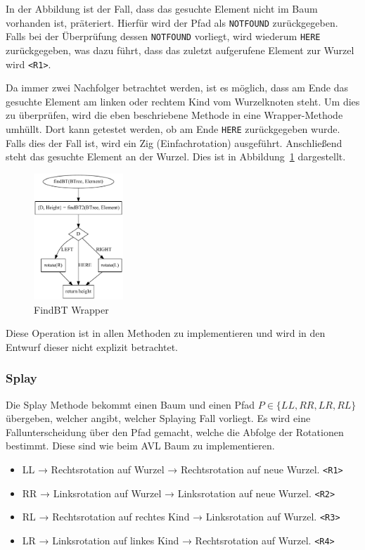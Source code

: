 In der Abbildung ist der Fall, dass das gesuchte Element nicht im Baum vorhanden ist, präteriert.
Hierfür wird der Pfad als \verb|NOTFOUND| zurückgegeben.
Falls bei der Überprüfung dessen \verb|NOTFOUND| vorliegt, wird wiederum \verb|HERE|
zurückgegeben, was dazu führt, dass das zuletzt aufgerufene Element zur Wurzel wird \verb|<R1>|.

Da immer zwei Nachfolger betrachtet werden, ist es möglich, dass am Ende das gesuchte Element
am linken oder rechtem Kind vom Wurzelknoten steht.
Um dies zu überprüfen, wird die eben beschriebene Methode in eine Wrapper-Methode umhüllt.
Dort kann getestet werden, ob am Ende \verb|HERE| zurückgegeben wurde.
Falls dies der Fall ist, wird ein Zig (Einfachrotation) ausgeführt.
Anschließend steht das gesuchte Element an der Wurzel.
Dies ist in Abbildung~\ref{fig:splayFind2} dargestellt.
\begin{figure}[hbt]
    \centering
    \includegraphics[width=0.3\textwidth]{img/gv/splayFind}
    \caption{FindBT Wrapper}
    \label{fig:splayFind2}
\end{figure}
Diese Operation ist in allen Methoden zu implementieren und wird in den Entwurf dieser nicht
explizit betrachtet.

\subsubsection{Splay}\label{par:splay}
Die Splay Methode bekommt einen Baum und einen Pfad \(P \in \{LL, RR, LR, RL\}\) übergeben,
welcher angibt, welcher Splaying Fall vorliegt.
Es wird eine Fallunterscheidung über den Pfad gemacht, welche die Abfolge der Rotationen bestimmt.
Diese sind wie beim AVL Baum zu implementieren.
\begin{itemize}
    \item LL → Rechtsrotation auf Wurzel → Rechtsrotation auf neue Wurzel. \verb|<R1>|
    \item RR → Linksrotation auf Wurzel → Linksrotation auf neue Wurzel. \verb|<R2>|
    \item RL → Rechtsrotation auf rechtes Kind → Linksrotation auf Wurzel. \verb|<R3>|
    \item LR → Linksrotation auf linkes Kind → Rechtsrotation auf Wurzel. \verb|<R4>|
\end{itemize}

